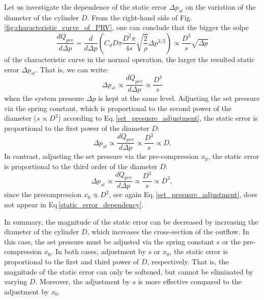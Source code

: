 Let us investigate the dependence of the static error $\Delta p_{st}$ on the variation of the diameter of the cylinder $D$. From the right-hand side of Fig.\,\ref{fig:characteristic_curve_of_PRV}, one can conclude that the bigger the solpe
%
\begin{equation}
\frac{d Q_{prv}}{d \Delta p} = \frac{d}{d \Delta p} \left( C_d D \pi \frac{D^2 \pi}{4 s} \sqrt{\frac{2}{\rho}} \Delta p^{3/2}\right) \propto \frac{D^3}{s} \sqrt{\Delta p}
\end{equation}
%
of the characteristic curve in the normal operation, the larger the resulted static error $\Delta p_{st}$. That is, we can write:
%
\begin{equation} \label{static_error_dependency}
\Delta p_{st} \propto \frac{d Q_{prv}}{d \Delta p} \propto \frac{D^3}{s}
\end{equation}
%
when the system pressure $\Delta p$ is kept at the same level. Adjusting the set pressure via the spring constant, which is proportional to the second power of the diameter ($s \propto D^2$) according to Eq.\,\eqref{set_presusre_adjustment}, the static error is proportional to the first power of the diameter $D$:
%
\begin{equation}
\Delta p_{st} \propto \frac{d Q_{prv}}{d \Delta p} \propto \frac{D^3}{s} \propto D.
\end{equation}
%
In contrast, adjusting the set pressure via the pre-compression $x_0$, the static error is proportional to the third order of the diameter $D$:
%
\begin{equation}
\Delta p_{st} \propto \frac{d Q_{prv}}{d \Delta p} \propto \frac{D^3}{s} \propto D^3,
\end{equation}
%
since the precompression $x_0 \propto D^2$, see again Eq.\,\eqref{set_presusre_adjustment}, does not appear in Eq\,\eqref{static_error_dependency}.

In summary, the magnitude of the static error can be decreased by increasing the diameter of the cylinder $D$, which increases the cross-section of the outflow. In this case, the set pressure must be adjusted via the spring constant $s$ or the pre-compression $x_0$. In both cases, adjustment by $s$ or $x_0$, the static error is proportional to the first and third power of $D$, respectively. That is, the magnitude of the static error can only be softened, but cannot be eliminated by varying $D$. Moreover, the adjustment by $s$ is more effective compared to the adjustment by $x_0$.

